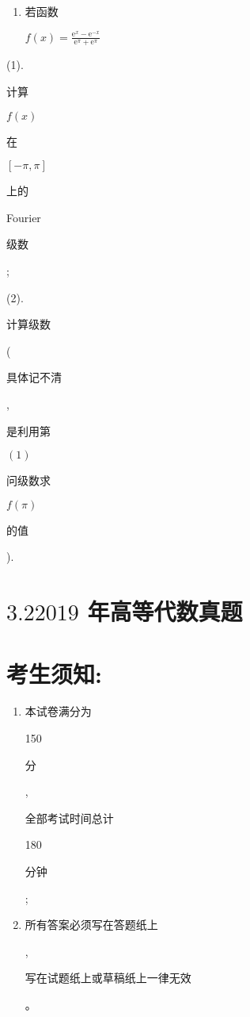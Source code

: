 \documentclass[10pt]{article}
\begin{document}
\begin{enumerate}
  \item \begin{CJK}{UTF8}{mj}若函数\end{CJK} $f(x)=\frac{\mathrm{e}^{x}-\mathrm{e}^{-x}}{\mathrm{e}^{\pi}+\mathrm{e}^{\pi}}$

\end{enumerate}
(1). \begin{CJK}{UTF8}{mj}计算\end{CJK} $f(x)$ \begin{CJK}{UTF8}{mj}在\end{CJK} $[-\pi, \pi]$ \begin{CJK}{UTF8}{mj}上的\end{CJK} Fourier \begin{CJK}{UTF8}{mj}级数\end{CJK};

(2). \begin{CJK}{UTF8}{mj}计算级数\end{CJK} (\begin{CJK}{UTF8}{mj}具体记不清\end{CJK}, \begin{CJK}{UTF8}{mj}是利用第\end{CJK} $(1)$ \begin{CJK}{UTF8}{mj}问级数求\end{CJK} $f(\pi)$ \begin{CJK}{UTF8}{mj}的值\end{CJK}).

\section{$3.22019$ 年高等代数真题}
\section{考生须知:}
\begin{enumerate}
  \item \begin{CJK}{UTF8}{mj}本试卷满分为\end{CJK} 150 \begin{CJK}{UTF8}{mj}分\end{CJK}, \begin{CJK}{UTF8}{mj}全部考试时间总计\end{CJK} 180 \begin{CJK}{UTF8}{mj}分钟\end{CJK};

  \item \begin{CJK}{UTF8}{mj}所有答案必须写在答题纸上\end{CJK}, \begin{CJK}{UTF8}{mj}写在试题纸上或草稿纸上一律无效\end{CJK}。

\end{enumerate}
\end{document}
